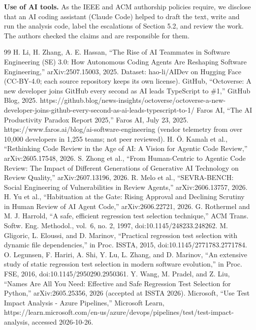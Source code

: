 \documentclass[conference]{IEEEtran}
\begin{document}
\textbf{Use of AI tools.} As the IEEE and ACM authorship policies require, we disclose that an AI coding assistant (Claude Code) helped to draft the text, write and run the analysis code, label the escalations of Section 5.2, and review the work. The authors checked the claims and are responsible for them.

\begin{thebibliography}{99}
 H. Li, H. Zhang, A. E. Hassan, ``The Rise of AI Teammates in Software Engineering (SE) 3.0: How Autonomous Coding Agents Are Reshaping Software Engineering,'' arXiv:2507.15003, 2025. Dataset: hao-li/AIDev on Hugging Face (CC-BY-4.0; each source repository keeps its own license).
 GitHub, ``Octoverse: A new developer joins GitHub every second as AI leads TypeScript to \#1,'' GitHub Blog, 2025. https://github.blog/news-insights/octoverse/octoverse-a-new-developer-joins-github-every-second-as-ai-leads-typescript-to-1/
 Faros AI, ``The AI Productivity Paradox Report 2025,'' Faros AI, July 23, 2025. https://www.faros.ai/blog/ai-software-engineering (vendor telemetry from over 10,000 developers in 1,255 teams; not peer reviewed).
 H. Ö. Kamalı et al., ``Rethinking Code Review in the Age of AI: A Vision for Agentic Code Review,'' arXiv:2605.17548, 2026.
 S. Zhong et al., ``From Human-Centric to Agentic Code Review: The Impact of Different Generations of Generative AI Technology on Review Quality,'' arXiv:2607.13196, 2026.
 R. Melo et al., ``SEVRA-BENCH: Social Engineering of Vulnerabilities in Review Agents,'' arXiv:2606.13757, 2026.
 H. Yu et al., ``Habituation at the Gate: Rising Approval and Declining Scrutiny in Human Review of AI Agent Code,'' arXiv:2606.22721, 2026.
 G. Rothermel and M. J. Harrold, ``A safe, efficient regression test selection technique,'' ACM Trans. Softw. Eng. Methodol., vol.~6, no. 2, 1997, doi:10.1145/248233.248262.
 M. Gligoric, L. Eloussi, and D. Marinov, ``Practical regression test selection with dynamic file dependencies,'' in Proc. ISSTA, 2015, doi:10.1145/2771783.2771784.
 O. Legunsen, F. Hariri, A. Shi, Y. Lu, L. Zhang, and D. Marinov, ``An extensive study of static regression test selection in modern software evolution,'' in Proc. FSE, 2016, doi:10.1145/2950290.2950361.
 Y. Wang, M. Pradel, and Z. Liu, ``Names Are All You Need: Effective and Safe Regression Test Selection for Python,'' arXiv:2605.25356, 2026 (accepted at ISSTA 2026).
 Microsoft, ``Use Test Impact Analysis - Azure Pipelines,'' Microsoft Learn, https://learn.microsoft.com/en-us/azure/devops/pipelines/test/test-impact-analysis, accessed 2026-10-26.

\end{thebibliography}
\end{document}
